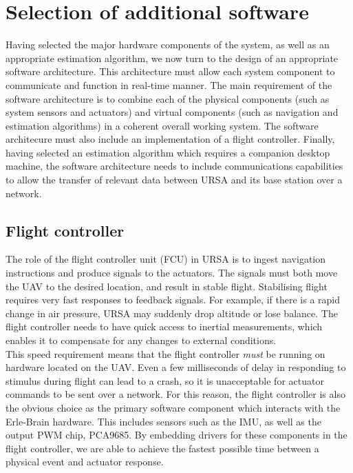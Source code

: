 \documentclass[capstone_report.tex]{subfiles}
\begin{document}
    \section{Selection of additional software}
    Having selected the major hardware components of the system, as well as an appropriate estimation algorithm, we now turn to the design of an appropriate software architecture. This architecture must allow each system component to communicate and function in real-time manner. The main requirement of the software architecture is to combine each of the physical components (such as system sensors and actuators) and virtual components (such as navigation and estimation algorithms) in a coherent overall working system. The software architecure must also include an implementation of a flight controller. Finally, having selected an estimation algorithm which requires a companion desktop machine, the software architecture needs to include communications capabilities to allow the transfer of relevant data between URSA and its base station over a network.\\

    \subsection{Flight controller}
    The role of the flight controller unit (FCU) in URSA is to ingest navigation instructions and produce signals to the actuators. The signals must both move the UAV to the desired location, and result in stable flight. Stabilising flight requires very fast responses to feedback signals. For example, if there is a rapid change in air pressure, URSA may suddenly drop altitude or lose balance. The flight controller needs to have quick access to inertial measurements, which enables it to compensate for any changes to external conditions. \\

    This speed requirement means that the flight controller \emph{must} be running on hardware located on the UAV. Even a few milliseconds of delay in responding to stimulus during flight can lead to a crash, so it is unacceptable for actuator commands to be sent over a network. For this reason, the flight controller is also the obvious choice as the primary software component which interacts with the Erle-Brain hardware. This includes sensors such as the IMU, as well as the output PWM chip, PCA9685. By embedding drivers for these components in the flight controller, we are able to achieve the fastest possible time between a physical event and actuator response. \\
\end{document}
